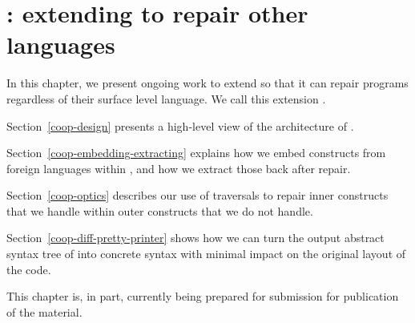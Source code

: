 \chapter{\Coop{}: extending \Chick{} to repair other languages}\label{coop}

In this chapter, we present ongoing work to extend \Chick{} so that it can
repair programs regardless of their surface level language.  We call this
extension \Coop{}.

Section~\ref{coop-design} presents a high-level view of the architecture of
\Coop{}.

Section~\ref{coop-embedding-extracting} explains how we embed constructs from
foreign languages within \Chick{}, and how we extract those back after repair.

Section~\ref{coop-optics} describes our use of traversals to repair inner
constructs that we handle within outer constructs that we do not handle.

Section~\ref{coop-diff-pretty-printer} shows how we can turn the output abstract
syntax tree of \Coop{} into concrete syntax with minimal impact on the original
layout of the code.






This chapter is, in part, currently being prepared for submission for
publication of the material.
